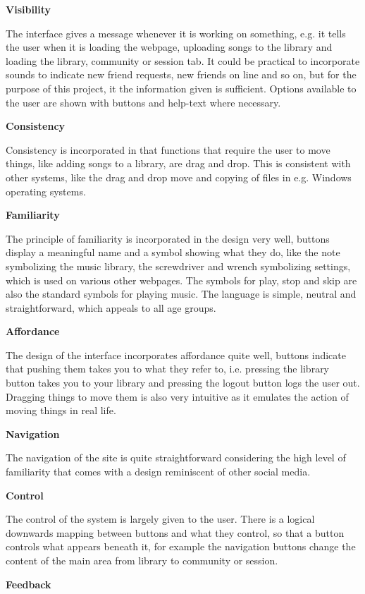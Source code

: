 \textbf{Visibility}

The interface gives a message whenever it is working on something, e.g. it tells the user when it is loading the webpage,
uploading songs to the library and loading the library, community or session tab. It could be practical to incorporate sounds
to indicate new friend requests, new friends on line and so on, but for the purpose of this project, it the information given
is sufficient. Options available to the user are shown with buttons and help-text where necessary.

\textbf{Consistency}

Consistency is incorporated in that functions that require the user to move things, like adding songs to a library, are drag
and drop. This is consistent with other systems, like the drag and drop move and copying of files in e.g. Windows operating
systems.

\textbf{Familiarity}

The principle of familiarity is incorporated in the design very well, buttons display a meaningful name and a symbol showing
what they do, like the note symbolizing the music library, the screwdriver and wrench symbolizing settings, which is used on
various other webpages. The symbols for play, stop and skip are also the standard symbols for playing music. The language is
simple, neutral and straightforward, which appeals to all age groups.

\textbf{Affordance}

The design of the interface incorporates affordance quite well, buttons indicate that pushing them takes you to what they
refer to, i.e. pressing the library button takes you to your library and pressing the logout button logs the user out.
Dragging things to move them is also very intuitive as it emulates the action of moving things in real life.

\textbf{Navigation}

The navigation of the site is quite straightforward considering the high level of familiarity that comes with a design reminiscent of other social media.

\textbf{Control}

The control of the system is largely given to the user. There is a logical downwards mapping between buttons and what they control, so that a button controls what appears beneath it, for example the navigation buttons change the content of the main area from library to community or session.

\textbf{Feedback}

